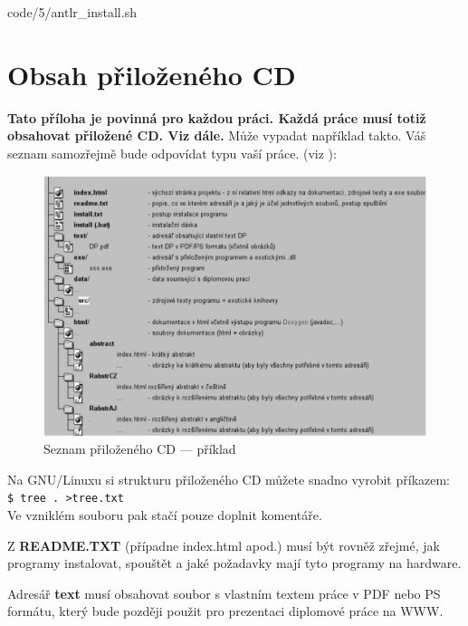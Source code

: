 
            {code/5/antlr_install.sh}


\chapter{Obsah přiloženého CD}
\textbf{\large Tato příloha je povinná pro každou práci. Každá práce musí totiž obsahovat přiložené CD. Viz dále.}
Může vypadat například takto. Váš seznam samozřejmě bude odpovídat typu vaší práce. (viz \cite{infodp}):
\begin{figure}[h]
\begin{center}
\includegraphics[width=14cm]{figures/seznamcd}
\caption{Seznam přiloženého CD --- příklad}
\label{fig:seznamcd}
\end{center}
\end{figure}
Na GNU/Linuxu si strukturu přiloženého CD můžete snadno vyrobit příkazem:\\ 
\verb|$ tree . >tree.txt|\\
Ve vzniklém souboru pak stačí pouze doplnit komentáře.

Z \textbf{README.TXT} (případne index.html apod.)  musí být rovněž zřejmé, jak programy instalovat, spouštět a jaké požadavky mají tyto programy na hardware.

Adresář \textbf{text}  musí obsahovat soubor s vlastním textem práce v PDF nebo PS formátu, který bude později použit pro prezentaci diplomové práce na WWW.
